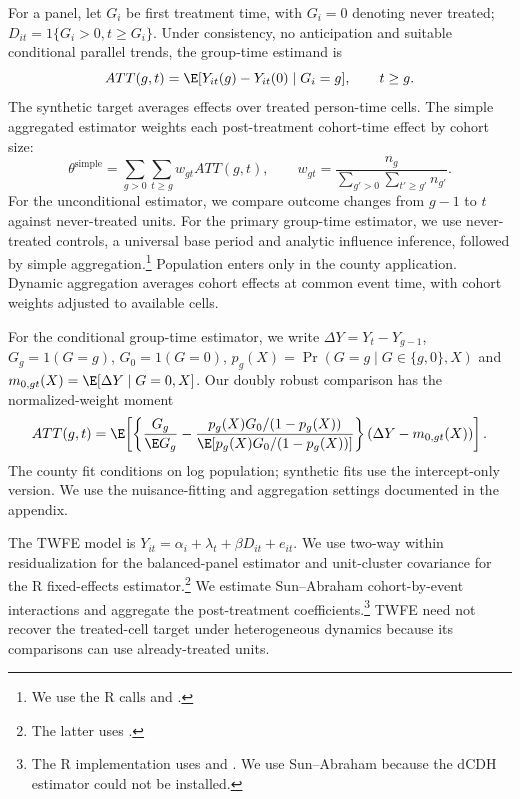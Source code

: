 For a panel, let $G_i$ be first treatment time, with $G_i=0$ denoting never treated; $D_{it}=1\{G_i>0, t\geq G_i\}$. Under consistency, no anticipation and suitable conditional parallel trends, the group-time estimand is
\begin{equation}
 ATT(g, t)=\E[Y_{it}(g)-Y_{it}(0)\mid G_i=g],\qquad t\geq g.
\end{equation}
The synthetic target averages effects over treated person-time cells. The simple aggregated estimator weights each post-treatment cohort-time effect by cohort size:
\begin{equation}
 \theta^{\mathrm{simple}}=\sum_{g>0}\sum_{t\geq g}w_{gt}ATT(g, t),\qquad
 w_{gt}=\frac{n_g}{\sum_{g'>0}\sum_{t'\geq g'}n_{g'}}.
\end{equation}
For the unconditional estimator, we compare outcome changes from $g-1$ to $t$ against never-treated units. For the primary group-time estimator, we use never-treated controls, a universal base period and analytic influence inference, followed by simple aggregation.\footnote{We use the R calls  and .} Population enters only in the county application. Dynamic aggregation averages cohort effects at common event time, with cohort weights adjusted to available cells.

For the conditional group-time estimator, we write $\Delta Y=Y_t-Y_{g-1}$, $G_g=1(G=g)$, $G_0=1(G=0)$, $p_g(X)=\Pr(G=g\mid G\in\{g,0\}, X)$ and $m_{0, gt}(X)=\E[\Delta Y\mid G=0, X]$. Our doubly robust comparison has the normalized-weight moment
\begin{equation}
 ATT(g, t)=\E\!\left[\left\{\frac{G_g}{\E G_g}-\frac{p_g(X)G_0/(1-p_g(X))}{\E[p_g(X)G_0/(1-p_g(X))]}\right\}(\Delta Y-m_{0, gt}(X))\right].
\end{equation}
The county fit conditions on log population; synthetic fits use the intercept-only version. We use the nuisance-fitting and aggregation settings documented in the appendix.

The TWFE model is $Y_{it}=\alpha_i+\lambda_t+\beta D_{it}+e_{it}$. We use two-way within residualization for the balanced-panel estimator and unit-cluster covariance for the R fixed-effects estimator.\footnote{The latter uses .} We estimate Sun--Abraham cohort-by-event interactions and aggregate the post-treatment coefficients.\footnote{The R implementation uses  and . We use Sun--Abraham because the dCDH estimator could not be installed.} TWFE need not recover the treated-cell target under heterogeneous dynamics because its comparisons can use already-treated units.
